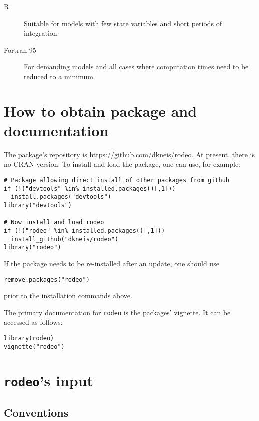 \documentclass[a4paper]{article}
\newcommand{\rodeo}{\texttt{rodeo}}
\begin{document}
\begin{description}
 \item [R] Suitable for models with few state variables and short periods of integration.
 \item [Fortran 95] For demanding models and all cases where computation times need to be reduced to a minimum.
\end{description}


\section{How to obtain package and documentation} \label{sec:obtain}

The package's repository is \url{https://github.com/dkneis/rodeo}. At present, there is no CRAN version. To install and load the package, one can use, for example:

\begin{verbatim}
# Package allowing direct install of other packages from github
if (!("devtools" %in% installed.packages()[,1]))
  install.packages("devtools")
library("devtools")

# Now install and load rodeo
if (!("rodeo" %in% installed.packages()[,1]))
  install_github("dkneis/rodeo")
library("rodeo")
\end{verbatim}

If the package needs to be re-installed after an update, one should use

\begin{verbatim}
remove.packages("rodeo")
\end{verbatim}

prior to the installation commands above.

The primary documentation for \rodeo{} is the packages' vignette. It can be accessed as follows:

\begin{verbatim}
library(rodeo)
vignette("rodeo")
\end{verbatim}


\section{\rodeo{}'s input} \label{sec:input}

\subsection{Conventions} \label{sec:input:conventions}
\end{document}
